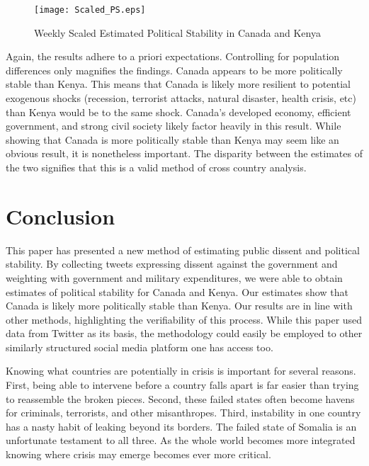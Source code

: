 \documentclass[12pt]{article}
\begin{document}
\begin{spacing}{1.5}
\begin{figure}[htb]
\centering 
\texttt{[image: Scaled\_PS.eps]} 
\caption{Weekly Scaled Estimated Political Stability in Canada and Kenya}
\end{figure}

Again, the results adhere to a priori expectations. Controlling for population differences only magnifies the findings. Canada appears to be more politically stable than Kenya. This means that Canada is likely more resilient to potential exogenous shocks (recession, terrorist attacks, natural disaster, health crisis, etc) than Kenya would be to the same shock. Canada's developed economy, efficient government, and strong civil society likely factor heavily in this result. While showing that Canada is more politically stable than Kenya may seem like an obvious result, it is nonetheless important. The disparity between the estimates of the two signifies that this is a valid method of cross country analysis.


\section*{Conclusion}

This paper has presented a new method of estimating public dissent and political stability. By collecting tweets expressing dissent against the government and weighting with government and military expenditures, we were able to obtain estimates of political stability for Canada and Kenya. Our estimates show that Canada is likely more politically stable than Kenya. Our results are in line with other methods, highlighting the verifiability of this process. While this paper used data from Twitter as its basis, the methodology could easily be employed to other similarly structured social media platform one has access too.    


Knowing what countries are potentially in crisis is important for several reasons. First, being able to intervene before a country falls apart is far easier than trying to reassemble the broken pieces. Second, these failed states often become havens for criminals, terrorists, and other misanthropes. Third, instability in one country has a nasty habit of leaking beyond its borders. The failed state of Somalia is an unfortunate testament to all three. As the whole world becomes more integrated knowing where crisis may emerge becomes ever more critical. 



\end{spacing}
\end{document}
